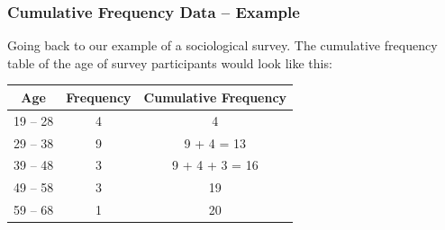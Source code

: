 \documentclass[aspectratio=169,11pt,svgnames]{beamer}
\begin{document}
\begin{frame}
 \frametitle{Cumulative Frequency Data -- Example}
 Going back to our example of a sociological survey. The cumulative frequency
 table of the age of survey participants would look like this:
 \begin{center}
  \begin{tabular}{c|c|c}
   \textbf{Age} & \textbf{Frequency} & \textbf{Cumulative Frequency}\\
   \toprule
   19 -- 28 & 4 & 4 \\
   29 -- 38 & 9 & 9 + 4 = 13 \\
   39 -- 48 & 3 & 9 + 4 + 3 = 16 \\
   49 -- 58 & 3 & 19 \\
   59 -- 68 & 1 & 20
  \end{tabular}
 \end{center}
\end{frame}
\end{document}
